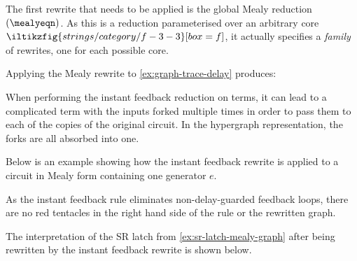 The first rewrite that needs to be applied is the global Mealy reduction
\((\mealyeqn)\).
As this is a reduction parameterised over an arbitrary core \(
\iltikzfig{strings/category/f-3-3}[box=f]
\), it actually specifies a \emph{family} of rewrites, one for each possible
core.

\begin{example}\label{ex:sr-latch-mealy-graph}
    Applying the Mealy rewrite to \cref{ex:graph-trace-delay} produces:
    \begin{center}
    \end{center}
\end{example}

When performing the instant feedback reduction on terms, it can lead to a
complicated term with the inputs forked multiple times in order to pass them to
each of the copies of the original circuit.
In the hypergraph representation, the forks are all absorbed into one.

\begin{example}\label{ex:instant-feedback-rewrite}
    Below is an example showing how the instant feedback rewrite is applied to
    a circuit in Mealy form containing one generator \(e\).
    \begin{center}
        
    \end{center}
\end{example}

As the instant feedback rule eliminates non-delay-guarded feedback loops, there
are no red tentacles in the right hand side of the rule or the rewritten graph.

\begin{example}\label{ex:sr-latch-instant-feedback-graph}
    The interpretation of the SR latch from \cref{ex:sr-latch-mealy-graph}
    after being rewritten by the instant feedback rewrite is shown below.
    \begin{center}
    \end{center}
\end{example}

